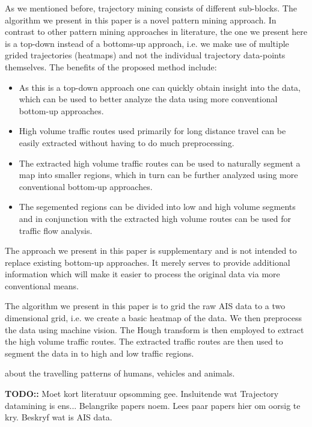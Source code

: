 \documentclass{article}
\begin{document}
As we mentioned before, trajectory mining consists of different sub-blocks. The algorithm we present in this paper is a novel pattern mining approach. In contrast to other 
pattern mining approaches in literature, the one we present here is a top-down instead of a bottoms-up approach, i.e. we make use of multiple grided 
trajectories (heatmaps) and not the individual trajectory data-points themselves. The benefits of the proposed method include:
\begin{itemize}
 \item As this is a top-down approach one can quickly obtain insight into the data, which can be used to better analyze the data using more conventional bottom-up approaches.
 \item High volume traffic routes used primarily for long distance travel can be easily extracted without having to do much preprocessing. 
 \item The extracted high volume traffic routes can be used to naturally segment a map into smaller regions, which in turn can be further analyzed using more conventional bottom-up approaches.
 \item The segemented regions can be divided into low and high volume segments and in conjunction with the extracted high volume routes can be used for traffic flow analysis.
\end{itemize}
The approach we present in this paper is supplementary and is not intended to replace existing bottom-up approaches. It merely serves to provide additional information 
which will make it easier to process the original data via more conventional means.

The algorithm we present in this paper is to grid the raw AIS data to a two dimensional grid, i.e. we create a basic heatmap of the data. We then preprocess the
data using machine vision. The Hough transform is then employed to extract the high volume traffic routes. The extracted traffic routes are then used to segment the 
data in to high and low traffic regions.










about the travelling patterns of humans, vehicles and animals. 

\textbf{TODO::} Moet kort literatuur opsomming gee. Insluitende wat Trajectory datamining is ens... Belangrike papers noem. Lees paar papers hier om oorsig te kry. Beskryf wat is 
AIS data.
\end{document}
